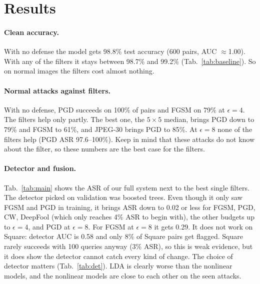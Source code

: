 \section{Results}
\label{sec:results}
\paragraph{Clean accuracy.} With no defense the model gets 98.8\% test accuracy (600 pairs, AUC $\approx$1.00). With any of the filters it stays between 98.7\% and 99.2\% (Tab.~\ref{tab:baseline}). So on normal images the filters cost almost nothing.

\paragraph{Normal attacks against filters.} With no defense, PGD succeeds on 100\% of pairs and FGSM on 79\% at $\epsilon{=}4$. The filters help only partly. The best one, the $5{\times}5$ median, brings PGD down to 79\% and FGSM to 61\%, and JPEG-30 brings PGD to 85\%. At $\epsilon{=}8$ none of the filters help (PGD ASR 97.6--100\%). Keep in mind that these attacks do not know about the filter, so these numbers are the best case for the filters.

\begin{table}[t]
\centering\small
\resizebox{\columnwidth}{!}{}
\caption{Clean test accuracy and attack success rate (ASR, lower is better) for single filters against normal (non-adaptive) attacks, 300 pairs. The subscript is $\epsilon$ in /255.}
\label{tab:baseline}
\end{table}

\paragraph{Detector and fusion.} Tab.~\ref{tab:main} shows the ASR of our full system next to the best single filters. The detector picked on validation was boosted trees. Even though it only saw FGSM and PGD in training, it brings ASR down to 0.02 or less for FGSM, PGD, CW, DeepFool (which only reaches 4\% ASR to begin with), the other budgets up to $\epsilon{=}4$, and PGD at $\epsilon{=}8$. For FGSM at $\epsilon{=}8$ it gets 0.29. It does not work on Square: detector AUC is 0.58 and only 8\% of Square pairs get flagged. Square rarely succeeds with 100 queries anyway (3\% ASR), so this is weak evidence, but it does show the detector cannot catch every kind of change. The choice of detector matters (Tab.~\ref{tab:det}). LDA is clearly worse than the nonlinear models, and the nonlinear models are close to each other on the seen attacks.

